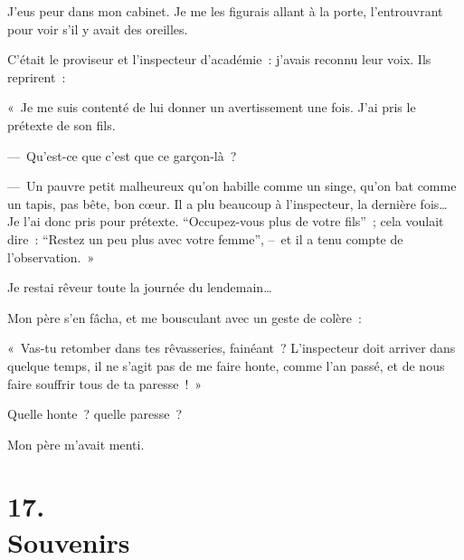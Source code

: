 \documentclass[french,twoside]{book} %
\begin{document}
J’eus peur dans mon cabinet. Je me les figurais allant à la porte, l’entrouvrant pour voir s’il y avait des oreilles.\par
C’était le proviseur et l’inspecteur d’académie : j’avais reconnu leur voix. Ils reprirent :\par
« Je me suis contenté de lui donner un avertissement une fois. J’ai pris le prétexte de son fils.\par
— Qu’est-ce que c’est que ce garçon-là ?\par
— Un pauvre petit malheureux qu’on habille comme un singe, qu’on bat comme un tapis, pas bête, bon cœur. Il a plu beaucoup à l’inspecteur, la dernière fois… Je l’ai donc pris pour prétexte. “Occupez-vous plus de votre fils” ; cela voulait dire : “Restez un peu plus avec votre femme”, – et il a tenu compte de l’observation. »\par
\bigbreak
\noindent Je restai rêveur toute la journée du lendemain…\par
Mon père s’en fâcha, et me bousculant avec un geste de colère :\par
« Vas-tu retomber dans tes rêvasseries, fainéant ? L’inspecteur doit arriver dans quelque temps, il ne s’agit pas de me faire honte, comme l’an passé, et de nous faire souffrir tous de ta paresse ! »\par
Quelle honte ? quelle paresse ?\par
Mon père m’avait menti.
\section[{17. Souvenirs}]{17. \\
Souvenirs}\renewcommand{\leftmark}{17. \\
Souvenirs}
\end{document}
